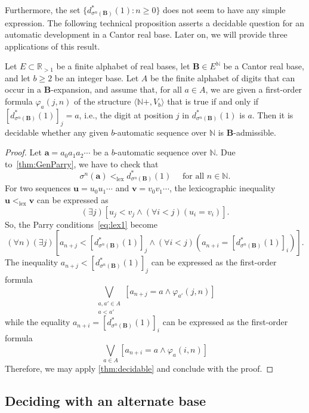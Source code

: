 \documentclass[12pt,reqno]{amsart}
\newcommand{\B}{{\mathbf{B}}}
\newcommand{\lex}{{\mathrm{lex}}}
\begin{document}
Furthermore, the set $\{d_{\sigma^n(\B)}^*(1):n\ge 0\}$ does not seem to have any simple expression.  The following technical proposition asserts a decidable question for an automatic development in a Cantor real base. Later on, we will provide three applications of this result.

\begin{theorem} 
\label{prop:decidability}
    Let $E\subset\mathbb{R}_{>1}$ be a finite alphabet of real bases, let $\B\in E^\mathbb{N}$ be a Cantor real base, and let $b\ge 2$ be an integer base. Let $A$ be the finite alphabet of digits that can occur in a $\B$-expansion, and assume that, for all $a\in A$, we are given a first-order formula $\varphi_{a}(j,n)$ of the structure $\langle\mathbb{N}+,V_b\rangle$ that is true if and only if $[d^*_{\sigma^n{(\B)}}(1)]_j=a$, i.e., the digit at position $j$ in $d^*_{\sigma^n{(\B)}}(1)$ is $a$. 
    Then it is decidable whether any given $b$-automatic sequence over $\mathbb{N}$ is $\B$-admissible.  
\end{theorem}

\begin{proof}
Let $\mathbf{a}=a_0a_1a_2\cdots$ be a $b$-automatic sequence over $\mathbb{N}$. 
Due to~\cref{thm:GenParry}, we have to check that 
\begin{equation} 
\label{eq:lex1}
    \sigma^n(\mathbf{a})<_{\lex} d_{\sigma^n(\B)}^*(1)\quad\text{ for all } n\in\mathbb{N}.
\end{equation}
For two sequences $\mathbf{u}=u_0u_1\cdots$ and $\mathbf{v}=v_0v_1\cdots$, the lexicographic inequality $\mathbf{u}<_{\lex} \mathbf{v}$ can be expressed as \[(\exists j)\left[u_j<v_j \wedge (\forall i<j) (u_i=v_i)\right].\] 
So, the Parry conditions~\eqref{eq:lex1} become
\[ 
    (\forall n)(\exists j)\left[a_{n+j}<[d_{\sigma^n(\B)}^*(1)]_j \wedge (\forall i<j) (a_{n+i}=[d_{\sigma^n(\B)}^*(1)]_i)\right].
\] 
The inequality $a_{n+j}<[d_{\sigma^n(\B)}^*(1)]_j$
can be expressed as the first-order formula
\[
    \bigvee_{\substack{a,a'\in A\\ a<a'}} [a_{n+j}=a \wedge \varphi_{a'}(j,n)]
\]
while the equality $a_{n+i}=[d_{\sigma^n(\B)}^*(1)]_i$ can be expressed as the first-order formula
\[
    \bigvee_{a\in A} [a_{n+i}=a \wedge \varphi_a(i,n)]
\]
Therefore, we may apply \cref{thm:decidable} and conclude with the proof.
\end{proof}




\subsection{Deciding with an alternate base} 
\end{document}
